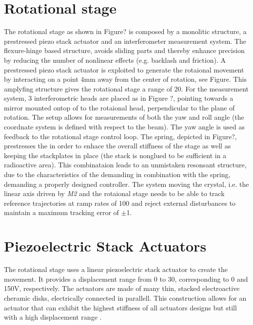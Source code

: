 \section{Rotational stage}
The rotational stage as shown in Figure? is composed by a monolitic structure, a prestressed piezo stack actuator and an interferometer measurement system. The flexure-hinge based structure, avoids sliding parts and thereby enhance precision by reducing the number of nonlinear effects (e.g. backlash and friction). A prestressed piezo stack actuator is exploited to generate the rotaional movement by interacting on a point 4mm away from the center of rotation, see Figure. This amplyfing structure gives the rotational stage a range of \unit{20}{\milli\rad}. For the measurement system, 3 interferometric heads are placed as in Figure ?, pointing towards a mirror mounted ontop of to the rotaional head, perpendicular to the plane of rotation. The setup allows for measurements of both the yaw and roll angle (the coordnate system is defined with respect to the beam). The yaw angle is used as feedback to the rotational stage control loop. The spring, depicted in Figure?, prestresses the \abbrPEA in order to enhace the overall stiffness of the stage as well as keeping the stackplates in place (the stack is nonglued to be sufficient in a radioactive area). This combinataion leads to an unmistaken resonsant structure, due to the characteristics of the \abbrPEA demanding in combination with the spring, demanding a properly designed controller. The system moving the crystal, i.e. the linear axis driven by \emph{M2} and the rotaional stage needs to be able to track reference trajectories at ramp rates of \unit{100}{\micro\radianpersecond} and reject external disturbances to maintain a maximum tracking error of $\pm$\unit{1}{\micro\rad}.

\section{Piezoelectric Stack Actuators}
The rotational stage uses a linear piezoelectric stack actuator to create the movement. It provides a displacement range from 0 to \unit{30}{\micro\meter}, corresponding to 0 and 150V, respectively. The actuators are made of many thin, stacked electroactive cheramic disks, electrically connected in parallell. This construction allows for an actuator that can exhibit the highest stiffness of all actuators designs but still with a high displacement range \cite{Piezo:2008}.

